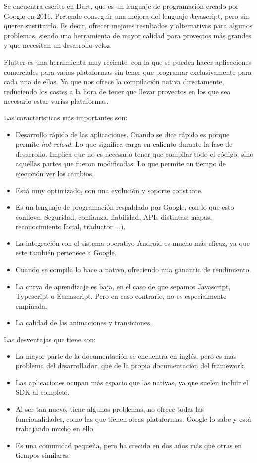 Se encuentra escrito en Dart, que es un lenguaje de programación creado por Google en 2011. Pretende conseguir una mejora del lenguaje Javascript, pero sin querer sustituirlo. Es decir, ofrecer mejores resultados y alternativas para algunos problemas, siendo una herramienta de mayor calidad para proyectos más grandes y que necesitan un desarrollo veloz.

Flutter es una herramienta muy reciente, con la que se pueden hacer aplicaciones comerciales para varias plataformas sin tener que programar exclusivamente para cada una de ellas. Ya que nos ofrece la compilación nativa directamente, reduciendo los costes a la hora de tener que llevar proyectos en los que sea necesario estar varias plataformas.

Las características más importantes son: 

\begin{itemize}
	\item Desarrollo rápido de las aplicaciones. Cuando se dice rápido es porque permite \emph{hot reload}. Lo que significa carga en caliente durante la fase de desarrollo. Implica que no es necesario tener que compilar todo el código, sino aquellas partes que fueron modificadas. Lo que permite en tiempo de ejecución ver los cambios.
	\item Está muy optimizado, con una evolución y soporte constante.
	\item Es un lenguaje de programación respaldado por Google, con lo que esto conlleva. Seguridad, confianza, fiabilidad, APIs distintas: mapas, reconocimiento facial, traductor ...).
	\item La integración con el sistema operativo Android es mucho más eficaz, ya que este también pertenece a Google.
	\item Cuando se compila lo hace a nativo, ofreciendo una ganancia de rendimiento.
	\item La curva de aprendizaje es baja, en el caso de que sepamos Javascript, Typescript o Ecmascript. Pero en caso contrario, no es especialmente empinada.
	\item La calidad de las animaciones y transiciones.
\end{itemize}

Las desventajas que tiene son:
\begin{itemize}
	\item La mayor parte de la documentación se encuentra en inglés, pero es más problema del desarrollador, que de la propia documentación del framework.
	\item Las aplicaciones ocupan más espacio que las nativas, ya que suelen incluir el SDK al completo.
	\item Al ser tan nuevo, tiene algunos problemas, no ofrece todas las funcionalidades, como las que tienen otras plataformas. Google lo sabe y está trabajando mucho en ello.
	\item Es una comunidad pequeña, pero ha crecido en dos años más que otras en tiempos similares.
\end{itemize}

